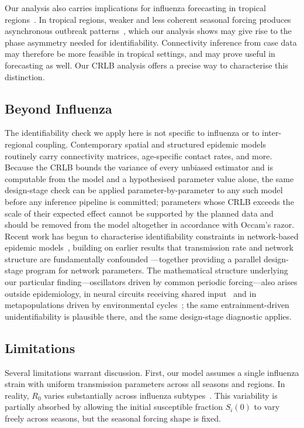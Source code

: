 Our analysis also carries implications for influenza forecasting in
tropical regions~\citep{tsang2024}. In tropical regions, weaker and
less coherent seasonal forcing produces asynchronous outbreak
patterns~\citep{tamerius2013}, which our analysis shows may give rise
to the phase asymmetry needed for identifiability. Connectivity
inference from case data may therefore be more feasible in tropical
settings, and may prove useful in forecasting as well. Our CRLB
analysis offers a precise way to characterise this distinction.

\subsection{Beyond Influenza}

The identifiability check we apply here is not specific to influenza
or to inter-regional coupling. Contemporary spatial and structured
epidemic models routinely carry connectivity matrices, age-specific
contact rates, and more. Because the CRLB bounds the variance of every
unbiased estimator and is computable from the model and a hypothesised
parameter value alone, the same design-stage check can be applied
parameter-by-parameter to any such model before any inference pipeline
is committed; parameters whose CRLB exceeds the scale of their
expected effect cannot be supported by the planned data and should be
removed from the model altogether in accordance with Occam's razor.
Recent work has begun to characterise identifiability constraints in
network-based epidemic models~\citep{kiss2023parameter, di2020network,
  kiss2024towards}, building on earlier results that transmission
rate and network structure are fundamentally confounded
\citep{welch2011}---together providing a parallel design-stage
program for network parameters. The
mathematical structure underlying our particular finding---oscillators
driven by common periodic forcing---also arises outside epidemiology,
in neural circuits receiving shared input~\citep{reid2019,
  pikovsky2001} and in metapopulations driven by environmental
cycles~\citep{bjornstad1999}; the same entrainment-driven
unidentifiability is plausible there, and the same design-stage
diagnostic applies.

\subsection{Limitations}
Several limitations warrant discussion. First, our model assumes a
single influenza strain with uniform transmission parameters across
all seasons and regions. In reality, $R_0$ varies substantially across
influenza subtypes~\citep{biggerstaff2014}. This variability is
partially absorbed by allowing the initial susceptible fraction
$S_i(0)$ to vary freely across seasons, but the seasonal forcing shape
is fixed.

